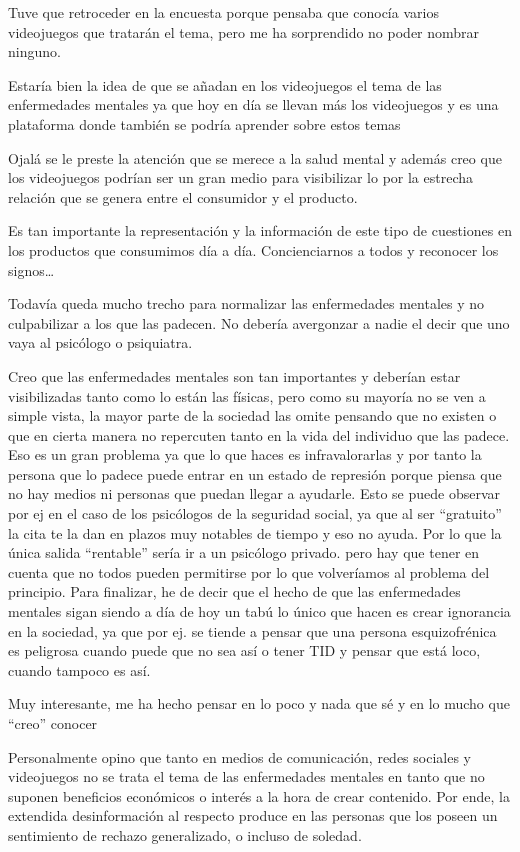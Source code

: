 \documentclass[12pt, a4paper,twoside,titlepage]{book}
\begin{document}
\begin{enumerate}[label=\textbf{\arabic*}.]
    Tuve que retroceder en la encuesta porque pensaba que conocía varios videojuegos que tratarán el tema, pero me ha sorprendido no poder nombrar ninguno.
    
    Estaría bien la idea de que se añadan en los videojuegos el tema de las enfermedades mentales ya que hoy en día se llevan más los videojuegos y es una plataforma donde también se podría aprender sobre estos temas
    
    Ojalá se le preste la atención que se merece a la salud mental y además creo que los videojuegos podrían ser un gran medio para visibilizar lo por la estrecha relación que se genera entre el consumidor y el producto.
    
    Es tan importante la representación y la información de este tipo de cuestiones en los productos que consumimos día a día. Concienciarnos a todos y reconocer los signos…
    
    Todavía queda mucho trecho para normalizar las enfermedades mentales y no culpabilizar a los que las padecen. No debería avergonzar a nadie el decir que uno vaya al psicólogo o psiquiatra.
    
    Creo que las enfermedades mentales son tan importantes y deberían estar visibilizadas tanto como lo están las físicas, pero como su mayoría no se ven a simple vista, la mayor parte de la sociedad las omite pensando que no existen o que en cierta manera no repercuten tanto en la vida del individuo que las padece. Eso es un gran problema ya que lo que haces es infravalorarlas y por tanto la persona que lo padece puede entrar en un estado de represión porque piensa que no hay medios ni personas que puedan llegar a ayudarle. Esto se puede observar por ej en el caso de los psicólogos de la seguridad social, ya que al ser ``gratuito'' la cita te la dan en plazos muy notables de tiempo y eso no ayuda. Por lo que la única salida ``rentable'' sería ir a un psicólogo privado. pero hay que tener en cuenta que no todos pueden permitirse por lo que volveríamos al problema del principio. Para finalizar, he de decir que el hecho de que las enfermedades mentales sigan siendo a día de hoy un tabú lo único que hacen es crear ignorancia en la sociedad, ya que por ej. se tiende a pensar que una persona esquizofrénica es peligrosa cuando puede que no sea así o tener TID y pensar que está loco, cuando tampoco es así.
    
    Muy interesante, me ha hecho pensar en lo poco y nada que sé y en lo mucho que “creo” conocer 
    
    Personalmente opino que tanto en medios de comunicación, redes sociales y videojuegos no se trata el tema de las enfermedades mentales en tanto que no suponen beneficios económicos o interés a la hora de crear contenido. Por ende, la extendida desinformación al respecto produce en las personas que los poseen un sentimiento de rechazo generalizado, o incluso de soledad.
    

\end{enumerate}
\end{document}
